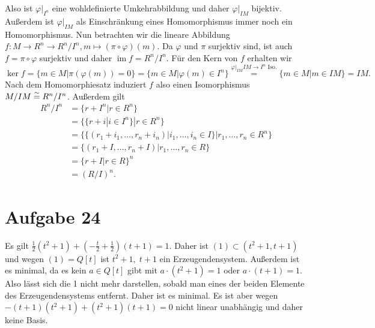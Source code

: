 \documentclass{article}
\theoremstyle{definition}
\newcommand{\im}{\operatorname{im}}
\let\oldstackrel\stackrel
\renewcommand{\stackrel}[2]{%
    \oldstackrel{\mathclap{#1}}{#2}
}%
\begin{document}
\begin{enumerate}[(a)]
    Also ist $\varphi|_{I^n}$ eine wohldefinierte Umkehrabbildung und daher $\varphi|_{IM}$ bijektiv. Außerdem ist $\varphi|_{IM}$ als Einschränkung eines Homomorphismus immer noch ein Homomorphismus.
    Nun betrachten wir die lineare Abbildung $f \colon M \to R^n \to R^n/I^n, m \mapsto (\pi \circ \varphi)(m)$. Da $\varphi$ und $\pi$ surjektiv sind, ist auch $f = \pi \circ \varphi$ surjektiv und daher $\im f = R^n/I^n$. Für den Kern von $f$ erhalten wir
    \[\ker f = \{m \in M| \pi(\varphi(m)) = 0\} = \{m \in M| \varphi(m) \in I^n\} \oldstackrel{\varphi|_{IM} IM \to I^n \text{ Iso.}}{=} \{m \in M| m \in IM\} = IM.\] 
    Nach dem Homomorphiesatz induziert $f$ also einen Isomorphismus $M/IM \stackrel{\sim}{=} R^n/I^n$. Außerdem gilt
    \begin{align*}
        R^n/I^n &= \{r + I^n| r \in R^n\}\\
        &= \{\{r + i| i\in I^n\}| r \in R^n\}\\
        &= \{\{(r_1 + i_1, \dots, r_n +i_n)|i_1, \dots, i_n \in I\}|r_1, \dots, r_n \in R^n\}\\
        &= \{(r_1 + I, \dots, r_n + I)|r_1, \dots, r_n\in R\}\\
        &= \{r + I|r \in R\}^n\\
        &= (R/I)^n.
    \end{align*}
\end{enumerate}
\section*{Aufgabe 24}
Es gilt $\frac{1}{2}(t^2 +1) +(-\frac{t}{2} + \frac{1}{2})(t + 1) = 1$. Daher ist $(1) \subset (t^2 + 1, t+1)$ und wegen $(1) = Q[t]$ ist $t^2 + 1,\; t+1$ ein Erzeugendensystem. Außerdem ist es minimal, da es kein $a \in Q[t]$ gibt mit $a\cdot (t^2 + 1) = 1$ oder $a\cdot (t+1) = 1$. Also lässt sich die 1 nicht mehr darstellen, sobald man eines der beiden Elemente des Erzeugendensystems entfernt. Daher ist es minimal. Es ist aber wegen $-(t+1) (t^2 + 1) + (t^2 + 1)(t+1) = 0$ nicht linear unabhängig und daher keine Basis.
\end{document}
